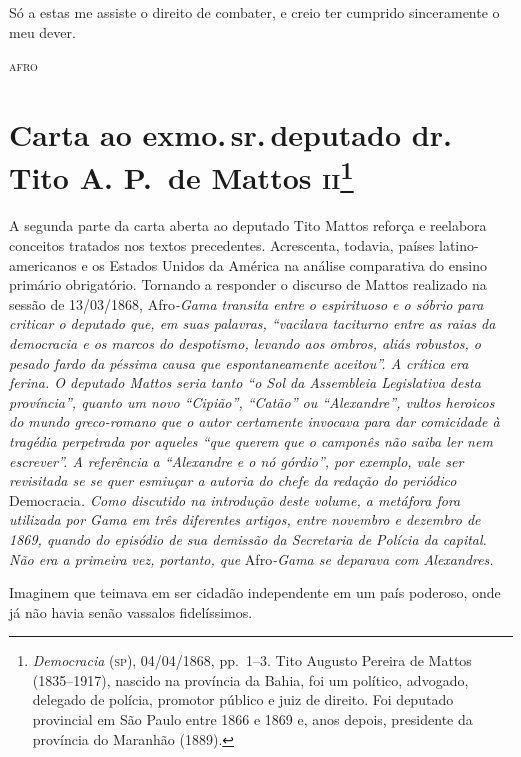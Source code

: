 Só a estas me assiste o direito de combater, e creio ter cumprido
sinceramente o meu dever.

\begin{flushright}
\textsc{afro}
\end{flushright}

\chapter{Carta ao exmo.\,sr.\,deputado dr.\,Tito A. P.~de Mattos
\textsc{ii}\footnote{\emph{Democracia} (\textsc{sp}), 04/04/1868, pp.~1--3.
  Tito Augusto Pereira de Mattos (1835--1917), nascido na província da
  Bahia, foi um político, advogado, delegado de polícia, promotor
  público e juiz de direito. Foi deputado provincial em São Paulo entre
  1866 e 1869 e, anos depois, presidente da província do Maranhão
  (1889).}}

\begin{didascalia}
A segunda parte da carta aberta ao deputado Tito Mattos reforça e
reelabora conceitos tratados nos textos precedentes. Acrescenta,
todavia, países latino-americanos e os Estados Unidos da América na
análise comparativa do ensino primário obrigatório. Tornando a responder
o discurso de Mattos realizado na sessão de 13/03/1868, Afro\emph{-Gama
transita entre o espirituoso e o sóbrio para criticar o deputado que, em
suas palavras, ``vacilava taciturno entre as raias da democracia e
os marcos do despotismo, levando aos ombros, aliás robustos, o pesado
fardo da péssima causa que espontaneamente aceitou''. A crítica era
ferina. O deputado Mattos seria tanto ``o Sol da Assembleia Legislativa
desta província'', quanto um novo ``Cipião'', ``Catão'' ou ``Alexandre'',
vultos heroicos do mundo greco-romano que o autor certamente invocava
para dar comicidade à tragédia perpetrada por aqueles ``que querem que o
camponês não saiba ler nem escrever''. A referência a ``Alexandre e o nó
górdio'', por exemplo, vale ser revisitada se se quer esmiuçar a autoria
do chefe da redação do periódico} Democracia\emph{. Como discutido na
introdução deste volume, a metáfora fora utilizada por Gama em três
diferentes artigos, entre novembro e dezembro de 1869, quando do
episódio de sua demissão da Secretaria de Polícia da capital. Não era a
primeira vez, portanto, que} Afro\emph{-Gama se deparava com
Alexandres.}
\end{didascalia}



Imaginem que teimava em ser cidadão independente em um país poderoso,
onde já não havia senão vassalos fidelíssimos.

